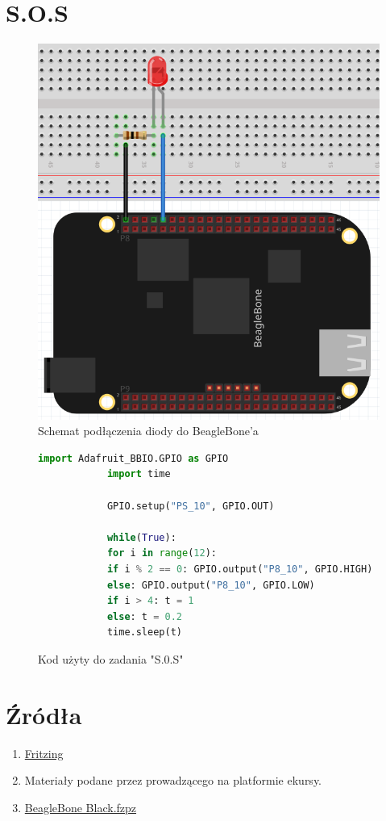 \documentclass[polish,a4paper]{article}
\begin{document}
	\section{S.O.S}
	\begin{figure}[h!]
		\begin{center}
			\includegraphics[scale=0.5]{01_beagle_sos.png}
			\caption*{Schemat podłączenia diody do BeagleBone'a}
		\end{center}
	\end{figure}
	\begin{figure}[h!]
		\begin{lstlisting}[language=python]
			import Adafruit_BBIO.GPIO as GPIO
			import time
			
			GPIO.setup("PS_10", GPIO.OUT)
			
			while(True):
			for i in range(12):
			if i % 2 == 0: GPIO.output("P8_10", GPIO.HIGH)
			else: GPIO.output("P8_10", GPIO.LOW)
			if i > 4: t = 1
			else: t = 0.2
			time.sleep(t)
		\end{lstlisting}
		\caption*{Kod użyty do zadania "S.0.S"}
	\end{figure}
	
	\newpage
	
	\section*{Źródła}
	\begin{enumerate}
		\item \href{https://forum.fritzing.org/}{Fritzing}
		\item Materiały podane przez prowadzącego na platformie ekursy.
		\item \href{https://github.com/adafruit/Fritzing-Library/blob/master/parts/BeagleBone%20Black.fzpz}{BeagleBone Black.fzpz} 
	\end{enumerate}
	\begingroup
	\hypersetup{hidelinks}
	\tableofcontents
	\endgroup
\end{document}
